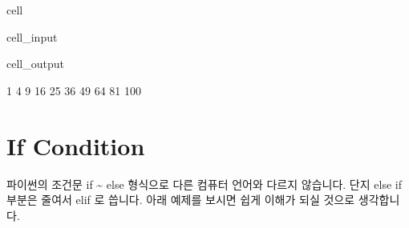 \documentclass[letterpaper,10pt,english]{jupyterBook}
\begin{document}
\begin{sphinxuseclass}{cell}\begin{sphinxVerbatimInput}

\begin{sphinxuseclass}{cell_input}
\begin{sphinxVerbatim}[commandchars=\\\{\}]
  
        
\end{sphinxVerbatim}

\end{sphinxuseclass}\end{sphinxVerbatimInput}
\begin{sphinxVerbatimOutput}

\begin{sphinxuseclass}{cell_output}
\begin{sphinxVerbatim}[commandchars=\\\{\}]
1
4
9
16
25
36
49
64
81
100
\end{sphinxVerbatim}

\end{sphinxuseclass}\end{sphinxVerbatimOutput}

\end{sphinxuseclass}

\part{If Condition}
\label{\detokenize{chapter2/2.1.4_Python_Basics:if-condition}}\label{\detokenize{chapter2/2.1.4_Python_Basics::doc}}
\sphinxAtStartPar
파이썬의 조건문 if \textasciitilde{} else 형식으로 다른 컴퓨터 언어와 다르지 않습니다. 단지 else if 부분은 줄여서 elif 로 씁니다. 아래 예제를 보시면 쉽게 이해가 되실 것으로 생각합니다.
\end{document}
